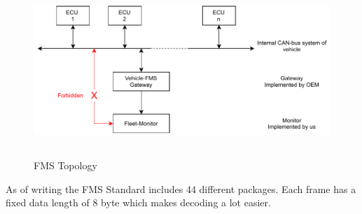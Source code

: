 \begin{figure}[h!]
	\centering
	\includegraphics[height=6.5cm]{images/fms-bus}
	\caption{FMS Topology}
	\vspace{-1.4ex}
	\label{fig:fms-bus}
\end{figure}

As of writing the FMS Standard includes 44 different packages. Each frame has a fixed data length of 8 byte which makes decoding a lot easier.   

